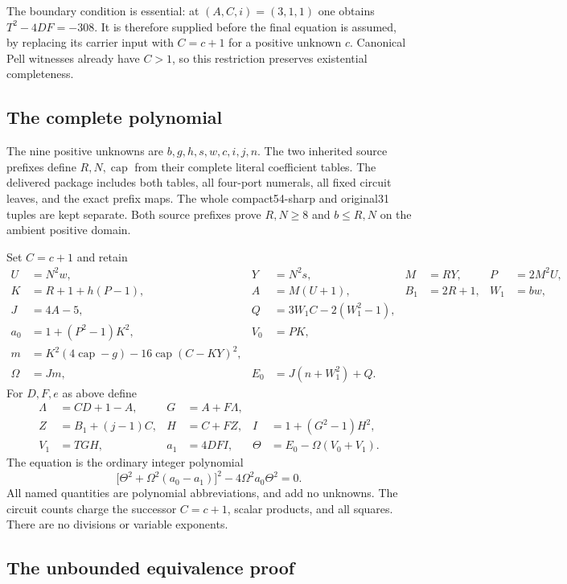 The boundary condition is essential: at $(A,C,i)=(3,1,1)$ one obtains
$T^2-4DF=-308$. It is therefore supplied before the final equation is
assumed, by replacing its carrier input with $C=c+1$ for a positive
unknown $c$. Canonical Pell witnesses already have $C>1$, so this
restriction preserves existential completeness.

\subsection{The complete polynomial}

The nine positive unknowns are $b,g,h,s,w,c,i,j,n$. The two inherited
source prefixes define $R,N,\operatorname{cap}$ from their complete
literal coefficient tables. The delivered package includes both tables,
all four-port numerals, all fixed circuit leaves, and the exact prefix
maps. The whole compact54-sharp and original31 tuples are kept separate.
Both source prefixes prove $R,N\ge8$ and $b\le R,N$ on the ambient
positive domain.

Set $C=c+1$ and retain
\begin{align*}
 U&=N^2w,&Y&=N^2s,&M&=RY,&P&=2M^2U,\\
 K&=R+1+h(P-1),&A&=M(U+1),&B_1&=2R+1,&W_1&=bw,\\
 J&=4A-5,&Q&=3W_1C-2(W_1^2-1),\\
 a_0&=1+(P^2-1)K^2,&V_0&=PK,\\
 m&=K^2(4\operatorname{cap}-g)
       -16\operatorname{cap}(C-KY)^2,\\
 \Omega&=Jm,&E_0&=J(n+W_1^2)+Q.
\end{align*}
For $D,F,e$ as above define
\begin{align*}
 \Lambda&=CD+1-A,&G&=A+F\Lambda,\\
 Z&=B_1+(j-1)C,&H&=C+FZ,&I&=1+(G^2-1)H^2,\\
 V_1&=TGH,&a_1&=4DFI,&\Theta&=E_0-\Omega(V_0+V_1).
\end{align*}
The equation is the ordinary integer polynomial
\begin{equation}\label{eq:local-majorant-nine}
 \bigl[\Theta^2+\Omega^2(a_0-a_1)\bigr]^2
       -4\Omega^2a_0\Theta^2=0.
\end{equation}
All named quantities are polynomial abbreviations, and add no unknowns.
The circuit counts charge the successor $C=c+1$, scalar products, and
all squares. There are no divisions or variable exponents.

\subsection{The unbounded equivalence proof}

